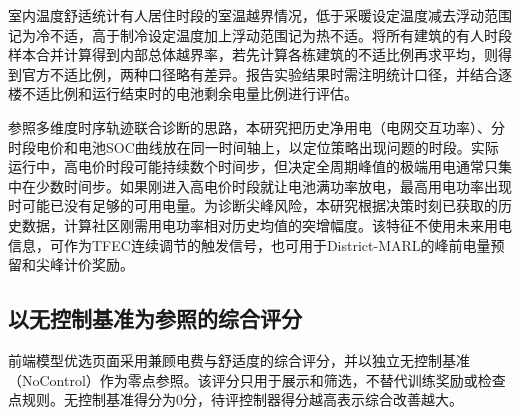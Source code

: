 室内温度舒适统计有人居住时段的室温越界情况，低于采暖设定温度减去浮动范围记为冷不适，高于制冷设定温度加上浮动范围记为热不适。将所有建筑的有人时段样本合并计算得到内部总体越界率，若先计算各栋建筑的不适比例再求平均，则得到官方不适比例，两种口径略有差异。报告实验结果时需注明统计口径，并结合逐楼不适比例和运行结束时的电池剩余电量比例进行评估。

参照多维度时序轨迹联合诊断的思路\cite{javeed2024}，本研究把历史净用电（电网交互功率）、分时段电价和电池SOC曲线放在同一时间轴上，以定位策略出现问题的时段。实际运行中，高电价时段可能持续数个时间步，但决定全周期峰值的极端用电通常只集中在少数时间步。如果刚进入高电价时段就让电池满功率放电，最高用电功率出现时可能已没有足够的可用电量。为诊断尖峰风险，本研究根据决策时刻已获取的历史数据，计算社区刚需用电功率相对历史均值的突增幅度。该特征不使用未来用电信息，可作为TFEC连续调节的触发信号，也可用于District-MARL的峰前电量预留和尖峰计价奖励。

\subsection{以无控制基准为参照的综合评分}\label{sec:nocontrol-score}
前端模型优选页面采用兼顾电费与舒适度的综合评分，并以独立无控制基准（NoControl）作为零点参照。该评分只用于展示和筛选，不替代训练奖励或检查点规则。无控制基准得分为$0$分，待评控制器得分越高表示综合改善越大。

